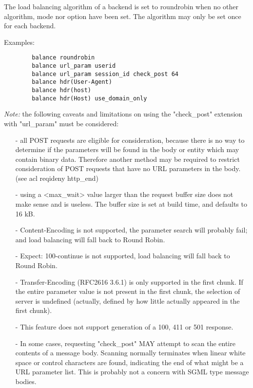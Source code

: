   The load balancing algorithm of a backend is set to roundrobin when no other
  algorithm, mode nor option have been set. The algorithm may only be set once
  for each backend.

  Examples:
  \begin{verbatim}
        balance roundrobin
        balance url_param userid
        balance url_param session_id check_post 64
        balance hdr(User-Agent)
        balance hdr(host)
        balance hdr(Host) use_domain_only
  \end{verbatim}

  \emph{Note:} the following caveats and limitations on using the "check\_post"
  extension with "url\_param" must be considered:
  
  \begin{itemize}
  \item[-] all POST requests are eligible for consideration, because there is no way
      to determine if the parameters will be found in the body or entity which
      may contain binary data. Therefore another method may be required to
      restrict consideration of POST requests that have no URL parameters in
      the body. (see acl reqideny http\_end)

  \item[-] using a <max\_wait> value larger than the request buffer size does not
      make sense and is useless. The buffer size is set at build time, and
      defaults to 16 kB.

  \item[-] Content-Encoding is not supported, the parameter search will probably
      fail; and load balancing will fall back to Round Robin.

  \item[-] Expect: 100-continue is not supported, load balancing will fall back to
      Round Robin.

  \item[-] Transfer-Encoding (RFC2616 3.6.1) is only supported in the first chunk.
      If the entire parameter value is not present in the first chunk, the
      selection of server is undefined (actually, defined by how little
      actually appeared in the first chunk).

  \item[-] This feature does not support generation of a 100, 411 or 501 response.

  \item[-] In some cases, requesting "check\_post" MAY attempt to scan the entire
      contents of a message body. Scanning normally terminates when linear
      white space or control characters are found, indicating the end of what
      might be a URL parameter list. This is probably not a concern with SGML
      type message bodies.
  \end{itemize}

